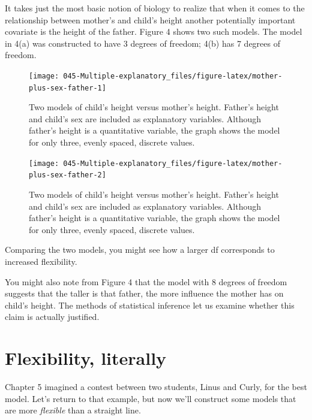 \documentclass[]{book}
\begin{document}
It takes just the most basic notion of biology to realize that when it comes to the relationship between mother's and child's height another potentially important covariate is the height of the father. Figure 4 shows two such models. The model in 4(a) was constructed to have 3 degrees of freedom; 4(b) has 7 degrees of freedom.



\begin{figure}\texttt{[image: 045-Multiple-explanatory\_files/figure-latex/mother-plus-sex-father-1]} \caption{Two models of child's height versus mother's height. Father's height and child's sex are included as explanatory variables. Although father's height is a quantitative variable, the graph shows the model for only three, evenly spaced, discrete values.}\label{fig:mother-plus-sex-father}
\end{figure}
\begin{figure}\texttt{[image: 045-Multiple-explanatory\_files/figure-latex/mother-plus-sex-father-2]} \caption{Two models of child's height versus mother's height. Father's height and child's sex are included as explanatory variables. Although father's height is a quantitative variable, the graph shows the model for only three, evenly spaced, discrete values.}\label{fig:mother-plus-sex-father}
\end{figure}

Comparing the two models, you might see how a larger df corresponds to increased flexibility.

You might also note from Figure 4 that the model with 8 degrees of freedom suggests that the taller is that father, the more influence the mother has on child's height. The methods of statistical inference let us examine whether this claim is actually justified.

\hypertarget{flexibility-literally}{%
\section{Flexibility, literally}\label{flexibility-literally}}

Chapter 5 imagined a contest between two students, Linus and Curly, for the best model. Let's return to that example, but now we'll construct some models that are more \emph{flexible} than a straight line.
\end{document}
